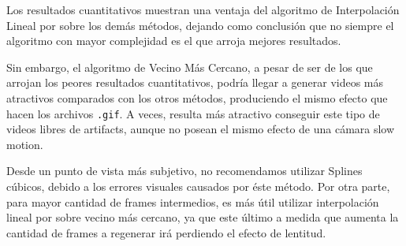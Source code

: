 
\par Los resultados cuantitativos muestran una ventaja del algoritmo de Interpolación Lineal por sobre los demás métodos, dejando como conclusión que no siempre el algoritmo con mayor complejidad es el que arroja mejores resultados. 
\par Sin embargo, el algoritmo de Vecino Más Cercano, a pesar de ser de los que arrojan los peores resultados cuantitativos, podría llegar a generar videos más atractivos comparados con los otros métodos, produciendo el mismo efecto que hacen los archivos \texttt{.gif}. A veces, resulta más atractivo conseguir este tipo de videos libres de artifacts, aunque no posean el mismo efecto de una cámara slow motion.

\par Desde un punto de vista más subjetivo, no recomendamos utilizar Splines cúbicos, debido a los errores visuales causados por \'este m\'etodo. Por otra parte, para mayor cantidad de frames intermedios, es más útil utilizar interpolaci\'on lineal por sobre vecino m\'as cercano, ya que este último a medida que aumenta la cantidad de frames a regenerar irá perdiendo el efecto de lentitud.